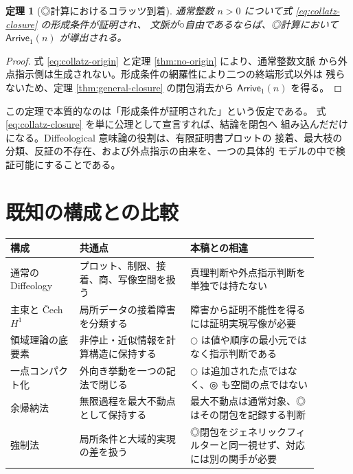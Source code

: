 \documentclass[a4paper,11pt]{ltjsarticle}
\theoremstyle{definition}
\theoremstyle{plain}
\newtheorem{theorem}[definition]{定理}
\newcommand{\dfix}{\mathord{\text{○}}}
\newcommand{\udfix}{\mathord{\text{◎}}}
\newcommand{\Arr}{\mathsf{Arrive}_{1}}
\newcommand{\1}{\mathbf{1}}
\begin{document}
\begin{theorem}[◎計算におけるコラッツ到着]\label{thm:ultimate-collatz}
通常整数 $n>0$ について式 \eqref{eq:collatz-closure} の形成条件が証明され、
文脈が○自由であるならば、◎計算において $\Arr(n)$ が導出される。
\end{theorem}

\begin{proof}
式 \eqref{eq:collatz-origin} と定理 \ref{thm:no-origin} により、通常整数文脈
から外点指示側は生成されない。形成条件の網羅性により二つの終端形式以外は
残らないため、定理 \ref{thm:general-closure} の閉包消去から $\Arr(n)$ を得る。
\end{proof}

この定理で本質的なのは「形成条件が証明された」という仮定である。
式 \eqref{eq:collatz-closure} を単に公理として宣言すれば、結論を閉包へ
組み込んだだけになる。Diffeological 意味論の役割は、有限証明書プロットの
接着、最大枝の分類、反証の不存在、および外点指示の由来を、一つの具体的
モデルの中で検証可能にすることである。

\section{既知の構成との比較}

\begin{center}
\begin{tabular}{p{0.20\linewidth}p{0.32\linewidth}p{0.37\linewidth}}
\toprule
構成 & 共通点 & 本稿との相違\\
\midrule
通常の Diffeology
& プロット、制限、接着、商、写像空間を扱う
& 真理判断や外点指示判断を単独では持たない\\
主束と Čech $H^1$
& 局所データの接着障害を分類する
& 障害から証明不能性を得るには証明実現写像が必要\\
領域理論の底要素
& 非停止・近似情報を計算構造に保持する
& $\dfix$ は値や順序の最小元ではなく指示判断である\\
一点コンパクト化
& 外向き挙動を一つの記法で閉じる
& $\dfix$ は追加された点ではなく、$\udfix$ も空間の点ではない\\
余帰納法
& 無限過程を最大不動点として保持する
& 最大不動点は通常対象、◎はその閉包を記録する判断\\
強制法
& 局所条件と大域的実現の差を扱う
& ◎閉包をジェネリックフィルターと同一視せず、対応には別の関手が必要\\
\bottomrule
\end{tabular}
\end{center}
\end{document}

